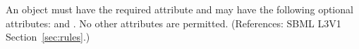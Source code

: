 An \AssignmentRule object must have the required attribute 
 and may have the following optional attributes:
 and .  No other attributes are permitted.  
(References: SBML L3V1 Section~\ref{sec:rules}.)

